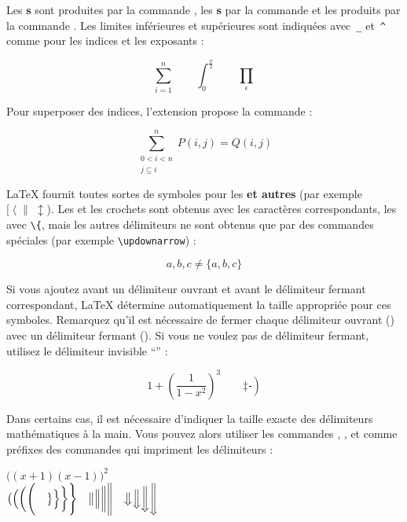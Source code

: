 Les \textbf{s} sont produites par la commande ,
les \textbf{s} par la commande  et les produits par la
commande . Les limites
inférieures et supérieures sont indiquées avec~\verb|_| et~\verb|^|
comme pour les indices et les exposants :
\begin{example}
\begin{equation*}
\sum_{i=1}^n \qquad
\int_0^{\frac{\pi}{2}} \qquad
\prod_\epsilon
\end{equation*}
\end{example}

Pour superposer des indices, l'extension  propose la
commande  :
\begin{example}
\begin{equation*}
\sum^n_{\substack{0<i<n \\ 
        j\subseteq i}}
   P(i,j) = Q(i,j)
\end{equation*}
\end{example}

\LaTeX{} fournit toutes sortes de symboles pour les
\textbf{ et autres } (par exemple
$[\;\langle\;\|\;\updownarrow$). Les  et les crochets
sont obtenus avec les caractères correspondants, les 
avec \verb|\{|, mais les autres délimiteurs ne sont obtenus que par des
commandes spéciales (par exemple \verb|\updownarrow|) :
\begin{example}
\begin{equation*}
{a,b,c} \neq \{a,b,c\}
\end{equation*}
\end{example}

Si vous ajoutez  avant un délimiteur ouvrant et
\vadjust{\pagebreak[3]}%
 avant le délimiteur fermant correspondant, \LaTeX{} détermine
automatiquement la taille appropriée pour ces symboles. Remarquez
qu'il est nécessaire de fermer chaque délimiteur ouvrant
() avec un délimiteur fermant (). Si vous
ne voulez pas de délimiteur fermant, utilisez le délimiteur invisible
\enquote{} :
\begin{example}
\begin{equation*}
1 + \left(\frac{1}{1-x^{2}}
    \right)^3 \qquad 
\left. \ddagger \frac{~}{~}\right)
\end{equation*}
\end{example}

Dans certains cas, il est nécessaire d'indiquer la taille exacte des
délimiteurs mathématiques à la main. Vous pouvez alors utiliser les
commandes , ,  et  comme préfixes
des commandes qui impriment les délimiteurs :
\begin{example}
$\Big((x+1)(x-1)\Big)^{2}$\\
$\big( \Big( \bigg( \Bigg( \quad
\big\} \Big\} \bigg\} \Bigg\}\quad
\big\| \Big\| \bigg\| \Bigg\|\quad
\big\Downarrow \Big\Downarrow 
\bigg\Downarrow \Bigg\Downarrow$
\end{example}

